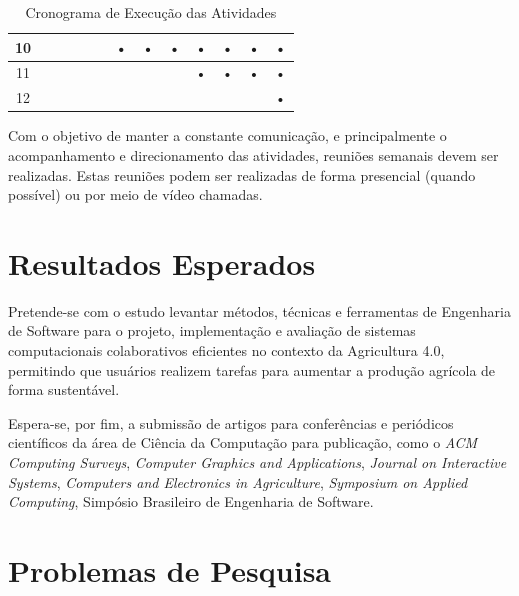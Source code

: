 \begin{table}[htbp]
\begin{tabular}{|c|c|c|c|c|c|c|c|c|c|c|c|c|}
		10                  &            &            &           &            &            & •         & •          & •          & •         & •          & •          & •         \\ \hline
		11                  &            &            &           &            &            &           &            &            & •         & •          & •          & •         \\ \hline
		12                  &            &            &           &            &            &           &            &            &           &            &            & •         \\ \hline
		\end{tabular}
	\caption{Cronograma de Execução das Atividades}
	\label{tab:cronograma}
\end{table}

Com o objetivo de manter a constante comunicação, e principalmente o acompanhamento e direcionamento das atividades, reuniões semanais devem ser realizadas. Estas reuniões podem ser realizadas de forma presencial (quando possível) ou por meio de vídeo chamadas.

\section{Resultados Esperados}
\label{sec:resultados_esperados}

Pretende-se com o estudo levantar métodos, técnicas e ferramentas de Engenharia de Software para o projeto, implementação e avaliação de sistemas computacionais colaborativos eficientes no contexto da Agricultura 4.0, permitindo que usuários realizem tarefas para aumentar a produção agrícola de forma sustentável.

Espera-se, por fim, a submissão de artigos para conferências e periódicos científicos da área de Ciência da Computação para publicação, como o \textit{ACM Computing Surveys}, \textit{Computer Graphics and Applications}, \textit{Journal on Interactive Systems}, \textit{Computers and Electronics in Agriculture}, \textit{Symposium on Applied Computing}, Simpósio Brasileiro de Engenharia de Software.



\appendix

\section{Problemas de Pesquisa}
\label{ape:problemas}

